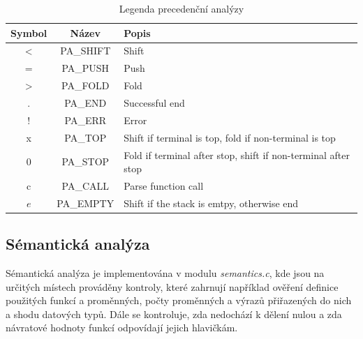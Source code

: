 \documentclass[a4paper, 12pt]{article} %
\begin{document}
                \begin{table}[h]
                    \centering
                    \begin{adjustbox}{width=0.72\textwidth}
                        \begin{tabular}{|c|c|l|}
                            \hline
                            \textbf{Symbol} & \textbf{Název} & \textbf{Popis}\\
                            \hline
                            \textless & PA\_SHIFT & Shift\\
                            \hline
                            = & PA\_PUSH & Push \\
                            \hline
                            \textgreater & PA\_FOLD & Fold \\
                            \hline
                            . & PA\_END & Successful end\\
                            \hline
                            ! & PA\_ERR  & Error\\
                            \hline
                            x & PA\_TOP &  Shift if terminal is top, fold if non-terminal is top\\
                            \hline
                            0 & PA\_STOP & Fold if terminal after stop, shift if non-terminal after stop\\
                            \hline
                            c & PA\_CALL & Parse function call\\
                            \hline
                            $e$ & PA\_EMPTY & Shift if the stack is emtpy, otherwise end\\
                        \hline
                        \end{tabular}
                    \end{adjustbox}
                    \caption{Legenda precedenční analýzy}
                  \end{table}

        \subsection{Sémantická analýza}\label{semantics}
            Sémantická analýza je implementována v modulu \textit{semantics.c}, kde jsou 
            na určitých místech prováděny kontroly, které zahrnují například 
            ověření definice použitých funkcí a proměnných, počty proměnných a výrazů přiřazených 
            do nich a shodu datových typů. Dále se kontroluje, zda nedochází k dělení nulou a zda 
            návratové hodnoty funkcí odpovídají jejich hlavičkám. 
            
\end{document}
